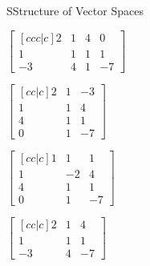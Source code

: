 \documentclass{article}[12pt]
\begin{document}
\begin{module}{S}{Structure of Vector Spaces}
\begin{readinessAssuranceTest}
  \begin{multicols}{4}
  \begin{readinessAssuranceTestChoices}
\item \(
    \begin{bmatrix}[ccc|c]
      2 & 1 & 4 & 0 \\
      1 & 1 & 1 & 1 \\
      -3 & 4 & 1 & -7
    \end{bmatrix}
  \) %
  \item \(
        \begin{bmatrix}[cc|c]
          2 & 1 & -3 \\
          1 & 1 & 4 \\
          4 & 1 & 1 \\
          0 & 1 & -7
        \end{bmatrix}
      \)
  \item \(
        \begin{bmatrix}[cc|c]
          1 & 1 & 1 \\
          1 & -2 & 4 \\
          4 & 1 & 1 \\
          0 & 1 & -7
        \end{bmatrix}
      \)
  \item \(
        \begin{bmatrix}[cc|c]
          2 & 1 & 4\\
          1 & 1 & 1 \\
          -3 & 4 & -7
        \end{bmatrix}
      \)

  \end{readinessAssuranceTestChoices}
  \end{multicols}




\end{readinessAssuranceTest}
\end{module}
\end{document}
